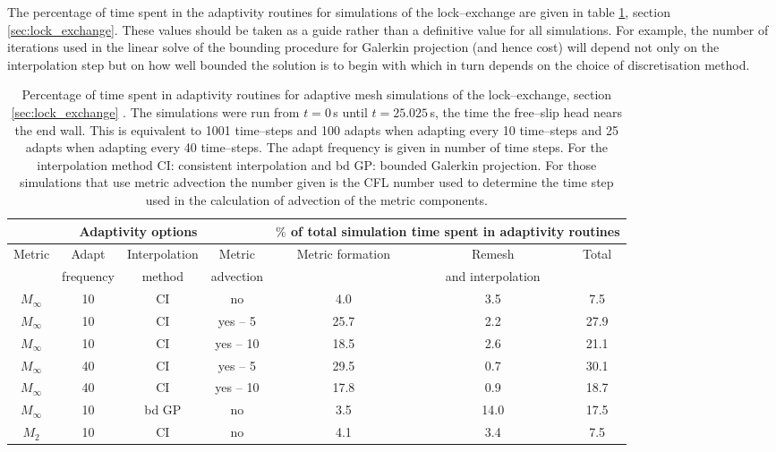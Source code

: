 The percentage of time spent in the adaptivity routines for simulations of the lock--exchange are given in table \ref{table:adaptivity_cost}, section \ref{sec:lock_exchange}. These values should be taken as a guide rather than a definitive value for all simulations. For example, the number of iterations used in the linear solve of the bounding procedure for Galerkin projection (and hence cost) will depend not only on the interpolation step but on how well bounded the solution is to begin with which in turn depends on the choice of discretisation method.

\begin{table}[h]
\centering
\begin{tabular}{|c|c|c|c|c|c|c|} \hline
\multicolumn{4}{|c|}{Adaptivity options} & \multicolumn{3}{c|}{$\%$ of total simulation time spent in adaptivity routines} \\ \hline
Metric & Adapt & Interpolation & Metric      &   Metric formation    & Remesh & Total          \\             
                & frequency & method & advection &                       &  and interpolation    &                \\ \hline                                              
$M_\infty$ & 10 & CI & no              &  4.0                  &    3.5               &   7.5               \\    
$M_\infty$ & 10 & CI & yes -- 5              &  25.7                 &    2.2                & 27.9             \\       
$M_\infty$ & 10 & CI & yes -- 10            & 18.5                 &    2.6                & 21.1             \\   
$M_\infty$ & 40 & CI & yes -- 5           &  29.5                 &    0.7                &   30.1         \\     
$M_\infty$ & 40 & CI & yes -- 10           &  17.8                &   0.9                &  18.7            \\      
 $M_\infty$ & 10 & bd GP & no          & 3.5                   &   14.0                &  17.5             \\                         
$M_2$ & 10 & CI & no	& 4.1			& 3.4			& 7.5		 \\ \hline
\end{tabular}
\caption[Percentage of total simulation run time spent in adaptive mesh routines for adaptive mesh simulations of the lock--exchange.]{Percentage of time spent in adaptivity routines for adaptive mesh simulations of the lock--exchange, section \ref{sec:lock_exchange} \citep{hiester2011}. The simulations were run from $t=0\,$s until $t=25.025\,$s, the time the free--slip head nears the end wall. This is equivalent to 1001 time--steps and 100 adapts when adapting every 10 time--steps and 25 adapts when adapting every 40 time--steps. The adapt frequency is given in number of time steps. For the interpolation method CI: consistent interpolation and bd GP: bounded Galerkin projection. For those simulations that use metric advection the number given is the CFL number used to determine the time step used in the calculation of advection of the metric components.}
\label{table:adaptivity_cost}
\end{table}


